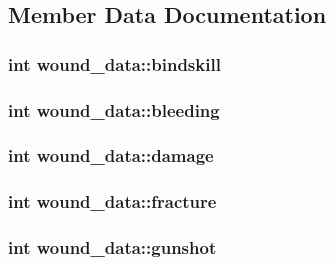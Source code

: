 \subsection{Member Data Documentation}
\hypertarget{structwound__data_a5125718894a9abf21860c54d2cc72549}{
\subsubsection[{bindskill}]{\setlength{\rightskip}{0pt plus 5cm}int wound\-\_\-data\-::bindskill}}\label{structwound__data_a5125718894a9abf21860c54d2cc72549}
\hypertarget{structwound__data_a59a84f83cfb4885e6e9bb2782265b100}{
\subsubsection[{bleeding}]{\setlength{\rightskip}{0pt plus 5cm}int wound\-\_\-data\-::bleeding}}\label{structwound__data_a59a84f83cfb4885e6e9bb2782265b100}
\hypertarget{structwound__data_aa6f172445dca229d7781f4dfdc895050}{
\subsubsection[{damage}]{\setlength{\rightskip}{0pt plus 5cm}int wound\-\_\-data\-::damage}}\label{structwound__data_aa6f172445dca229d7781f4dfdc895050}
\hypertarget{structwound__data_a6df02e8d8a22003c56b69d4ed5200bf6}{
\subsubsection[{fracture}]{\setlength{\rightskip}{0pt plus 5cm}int wound\-\_\-data\-::fracture}}\label{structwound__data_a6df02e8d8a22003c56b69d4ed5200bf6}
\hypertarget{structwound__data_a29aecddb9188f1fcbe5d911608cc7a42}{
\subsubsection[{gunshot}]{\setlength{\rightskip}{0pt plus 5cm}int wound\-\_\-data\-::gunshot}}\label{structwound__data_a29aecddb9188f1fcbe5d911608cc7a42}
